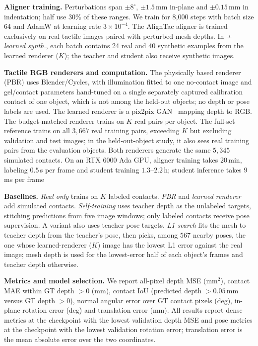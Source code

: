 \noindent\textbf{Aligner training.} Perturbations span $\pm8^\circ$, $\pm1.5\,$mm in-plane and $\pm0.15\,$mm in indentation; half use $30\%$ of these ranges. We train for 8,000 steps with batch size 64 and AdamW at learning rate $3\times10^{-4}$. The AlignTac aligner is trained exclusively on real tactile images paired with perturbed mesh depths. In \emph{+ learned synth.}, each batch contains 24 real and 40 synthetic examples from the learned renderer ($K$); the teacher and student also receive synthetic images.


\noindent\textbf{Tactile RGB renderers and computation.} The physically based renderer (PBR) uses Blender/Cycles, with illumination fitted to one no-contact image and gel/contact parameters hand-tuned on a single separately captured calibration contact of one object, which is not among the held-out objects; no depth or pose labels are used. The learned renderer is a pix2pix GAN~\cite{isola2017pix2pix} mapping depth to RGB. The budget-matched renderer trains on $K$ real pairs per object. The full-set reference trains on all $3{,}667$ real training pairs, exceeding $K$ but excluding validation and test images; in the held-out-object study, it also sees real training pairs from the evaluation objects. Both renderers generate the same $5{,}345$ simulated contacts. On an RTX 6000 Ada GPU, aligner training takes $20$\,min, labeling $0.5\,$s per frame and student training $1.3$--$2.2$\,h; student inference takes $9$\,ms per frame 

\noindent\textbf{Baselines.} \emph{Real only} trains on $K$ labeled contacts. \emph{PBR} and \emph{learned renderer} add simulated contacts. \emph{Self-training} uses teacher depth as the unlabeled targets, stitching predictions from five image windows; only labeled contacts receive pose supervision. A variant also uses teacher pose targets. \emph{L1 search} fits the mesh to teacher depth from the teacher's pose, then picks, among $567$ nearby poses, the one whose learned-renderer ($K$) image has the lowest L1 error against the real image; mesh depth is used for the lowest-error half of each object's frames and teacher depth otherwise.

\noindent\textbf{Metrics and model selection.} We report all-pixel depth MSE (mm$^2$), contact MAE within GT depth $>0$ (mm), contact IoU (predicted depth $>0.05\,$mm versus GT depth $>0$), normal angular error over GT contact pixels (deg), in-plane rotation error (deg) and translation error (mm). All results report dense metrics at the checkpoint with the lowest validation depth MSE and pose metrics at the checkpoint with the lowest validation rotation error; translation error is the mean absolute error over the two coordinates.
